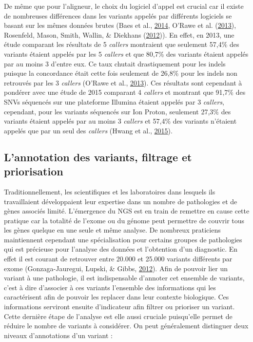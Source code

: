 \documentclass[12pt,twoside]{reedthesis}
\theoremstyle{definition}
\theoremstyle{definition}
\theoremstyle{remark}
\begin{document}
  De même que pour l'aligneur, le choix du logiciel d'appel est crucial
  car il existe de nombreuses différences dans les variants appelés par
  différents logiciels se basant sur les mêmes données brutes (Baes et
  al., \protect\hyperlink{ref-Baes2014}{2014}, O'Rawe et al.
  (\protect\hyperlink{ref-ORawe2013}{2013}), Rosenfeld, Mason, Smith,
  Wallin, \& Diekhans (\protect\hyperlink{ref-Rosenfeld2012}{2012})). En
  effet, en 2013, une étude comparant les résultats de 5 \emph{callers}
  montraient que seulement 57,4\% des variants étaient appelés par les 5
  \emph{callers} et que 80,7\% des variants étaient appelés par au moins 3
  d'entre eux. Ce taux chutait drastiquement pour les indels puisque la
  concordance était cette fois seulement de 26,8\% pour les indels non
  retrouvés par les 3 \emph{callers} (O'Rawe et al.,
  \protect\hyperlink{ref-ORawe2013}{2013}). Ces résultats sont cependant à
  pondérer avec une étude de 2015 comparant 4 \emph{callers} et montrant
  que 91,7\% des SNVs séquencés sur une plateforme Illumina étaient
  appelés par 3 \emph{callers}, cependant, pour les variants séquencés sur
  Ion Proton, seulement 27,3\% des variants étaient appelés par au moins 3
  \emph{callers} et 57,4\% des variants n'étaient appelés que par un seul
  des \emph{callers} (Hwang et al.,
  \protect\hyperlink{ref-Hwang2015}{2015}).
  
  \newpage
  
  \subsection{L'annotation des variants, filtrage et
  priorisation}\label{lannotation-des-variants-filtrage-et-priorisation}
  
  Traditionnellement, les scientifiques et les laboratoires dans lesquels
  ils travaillaient développaient leur expertise dans un nombre de
  pathologies et de gènes associés limité. L'émergence du NGS est en train
  de remettre en cause cette pratique car la totalité de l'exome ou du
  génome peut permettre de couvrir tous les gènes quelque en une seule et
  même analyse. De nombreux praticiens maintiennent cependant une
  spécialisation pour certains groupes de pathologies qui est précieuse
  pour l'analyse des données et l'obtention d'un diagnostic. En effet il
  est courant de retrouver entre 20.000 et 25.000 variants différents par
  exome (Gonzaga-Jauregui, Lupski, \& Gibbs,
  \protect\hyperlink{ref-Gonzaga-Jauregui2012}{2012}). Afin de pouvoir
  lier un variant à une pathologie, il est indispensable d'annoter cet
  ensemble de variants, c'est à dire d'associer à ces variants l'ensemble
  des informations qui les caractérisent afin de pouvoir les replacer dans
  leur contexte biologique. Ces informations serviront ensuite
  d'indicateur afin filtrer ou prioriser un variant. Cette dernière étape
  de l'analyse est elle aussi cruciale puisqu'elle permet de réduire le
  nombre de variants à considérer. On peut généralement distinguer deux
  niveaux d'annotations d'un variant :
  
\end{document}
